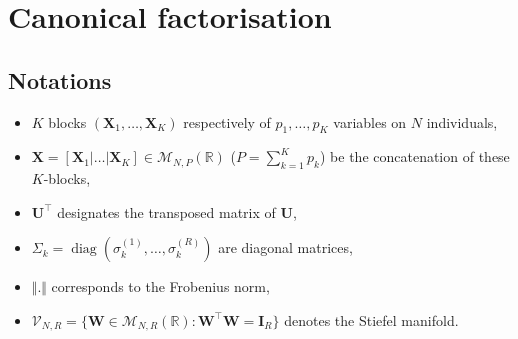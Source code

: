 \documentclass[11pt]{article}
\DeclareMathOperator{\diag}{diag}
\newcommand{\W}{\mathbf{W}}
\newcommand{\I}{\mathbf{I}}
\newcommand{\Stiefel}[2]{\mathcal V_{#1,#2}}
\begin{document}


\section{Canonical factorisation}
\subsection*{Notations}

\begin{itemize}
	\item $K$ blocks  $(\textbf{X}_1,\ldots,\textbf{X}_K)$ respectively of $p_1,\ldots,p_K$ variables on $N$ individuals,
	\item  $\textbf{X}=[\textbf{X}_1|\ldots|\textbf{X}_K]\in \mathcal M_{N,P}(\mathbb R)$ ($P=\sum_{k=1}^K p_k$) be the concatenation of these $K$-blocks,
	\item $\textbf{U}^\intercal$ designates the transposed matrix of $\textbf{U}$, 
	\item $\Sigma_k=\diag(\sigma_k^{(1)},\ldots,\sigma_k^{(R)})$ are diagonal matrices,
	\item $\Vert . \Vert$ corresponds to the Frobenius norm,
	\item $\Stiefel{N}{R}=\{\W\in\mathcal M_{N,R}(\mathbb R):\W^\intercal\W=\I_R\}$
denotes the Stiefel manifold.
\end{itemize}
 
\end{document}
